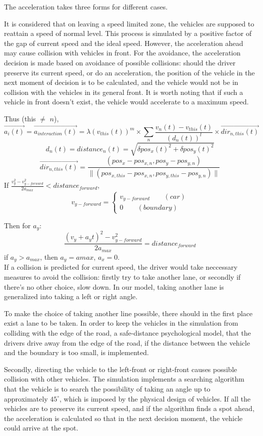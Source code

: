 \documentclass{mcmthesis}
\begin{document}
The acceleration takes three forms for different cases.

It is considered that on leaving a speed limited zone, the vehicles are supposed to reattain a speed of normal level. This process is simulated by a positive factor of the gap of current speed and the ideal speed. However, the acceleration ahead may cause collision with vehicles in front. For the avoidance, the acceleration decision is made based on avoidance of possible collisions: should the driver preserve its current speed, or do an acceleration, the position of the vehicle in the next moment of decision is to be calculated, and the vehicle would not be in collision with the vehicles in its general front. It is worth noting that if such a vehicle in front doesn't exist, the vehicle would accelerate to a maximum speed.

Thus (this $\ne$ $n$),
$$\overrightarrow{a_i(t)}=\overrightarrow{a_{interaction}(t)}=\lambda (v_{this}(t))^m \times \sum_n\frac{v_n(t)-v_{this}(t)}{(d_n(t))^l}\times \overrightarrow{dir_{n,this}(t)}$$
$$d_{n}(t)=distance_n(t)=\sqrt{\delta pos_x(t)^2+\delta pos_y(t)^2}$$
$$\overrightarrow{dir_{n,this}(t)}=\frac{(pos_x-pos_{x,n},pos_y-pos_{y,n})}{\parallel (pos_{x,this}-pos_{x,n},pos_{y,this}-pos_{y,n}) \parallel} $$
If $\frac{v_y^2-v_{y-forward}^2}{2a_{max}}<distance_{forward}$,
$$v_{y-forward}= \left\{ 
\begin{aligned}
v_{y-forward} \qquad (car)\\
0 \qquad (boundary)
\end{aligned}
\right.
$$

Then for $a_y$:
$$\frac{(v_y+a_yt)^2-v_{y-forward}^2}{2a_{max}}=distance_{forward}$$
if $a_y>a_{max}$, then $a_y=a{max}$, $a_x=0$.\\

If a collision is predicted for current speed, the driver would take neccessary measures to avoid the collision: firstly try to take another lane, or secondly if there's no other choice, slow down. In our model, taking another lane is generalized into taking a left or right angle.

To make the choice of taking another line possible, there should in the first place exist a lane to be taken. In order to keep the vehicles in the simulation from colliding with the edge of the road, a safe-distance psychological model, that the drivers drive away from the edge of the road, if the distance between the vehicle and the boundary is too small, is implemented. 

Secondly, directing the vehicle to the left-front or right-front causes possible collision with other vehicles. The simulation implements a searching algorithm that the vehicle is to search the possibility of taking an angle up to approximately $45^{\circ}$, which is imposed by the physical design of vehicles. If all the vehicles are to preserve its current speed, and if the algorithm finds a spot ahead, the acceleration is calculated so that in the next decision moment, the vehicle could arrive at the spot.
\end{document}
